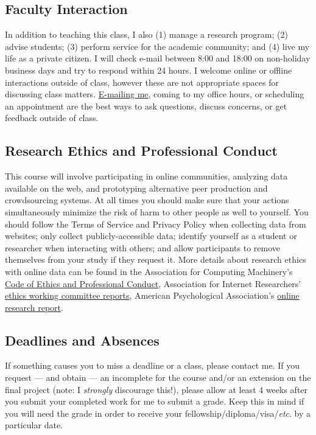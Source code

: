 \documentclass[10pt]{memoir}
\begin{document}
\subsection{Faculty Interaction}
In addition to teaching this class, I also (1) manage a research program; (2) advise students; (3) perform service for the academic community; and (4) live my life as a private citizen. I will check e-mail between 8:00 and 18:00 on non-holiday business days and try to respond within 24 hours. I welcome online or offline interactions outside of class, however these are not appropriate spaces for discussing class matters. \href{maito:brian.keegan@colorado.edu}{E-mailing me}, coming to my office hours, or scheduling an appointment are the best ways to ask questions, discuss concerns, or get feedback outside of class.

\subsection{Research Ethics and Professional Conduct}
This course will involve participating in online communities, analyzing data available on the web, and prototyping alternative peer production and crowdsourcing systems. At all times you should make sure that your actions simultaneously minimize the risk of harm to other people as well to yourself. You should follow the Terms of Service and Privacy Policy when collecting data from websites; only collect publicly-accessible data; identify yourself as a student or researcher when interacting with others; and allow participants to remove themselves from your study if they request it. More details about research ethics with online data can be found in the Association for Computing Machinery's \href{https://www.acm.org/about-acm/acm-code-of-ethics-and-professional-conduct}{Code of Ethics and Professional Conduct}, Association for Internet Researchers' \href{http://aoir.org/ethics/}{ethics working committee reports}, American Psychological Association's \href{http://www.apa.org/science/leadership/bsa/internet/internet-report.aspx}{online research report}.

\subsection{Deadlines and Absences}
If something causes you to miss a deadline or a class, please contact me. If you request --- and obtain --- an incomplete for the course and/or an extension on the final project (note: I \textit{strongly} discourage this!), please allow at least 4 weeks after you submit your completed work for me to submit a grade. Keep this in mind if you will need the grade in order to receive your fellowship/diploma/visa/\textit{etc}. by a particular date.
\end{document}
